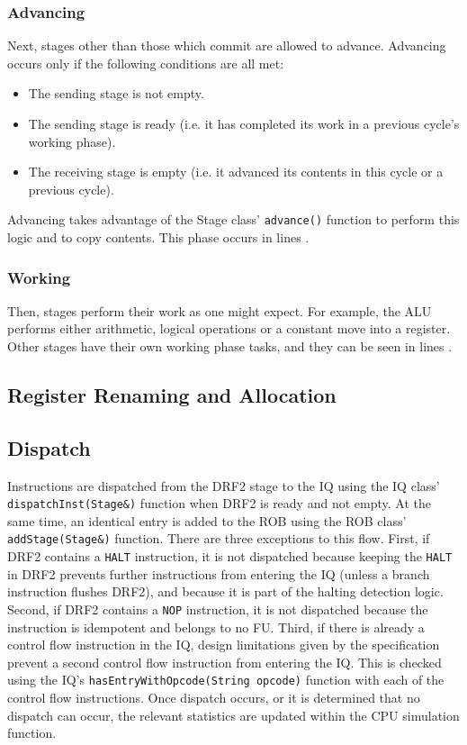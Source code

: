 \documentclass[12pt]{article}
\begin{document}
\subsubsection{Advancing}
Next, stages other than those which commit are allowed to advance.
Advancing occurs only if the following conditions are all met:
\begin{itemize}
  \item The sending stage is not empty.
  \item The sending stage is ready (i.e. it has completed its work in a previous cycle's working phase).
  \item The receiving stage is empty (i.e. it advanced its contents in this cycle or a previous cycle).
\end{itemize}
Advancing takes advantage of the Stage class' \texttt{advance()} function to perform this logic and to copy contents.
This phase occurs in lines .

\subsubsection{Working}
Then, stages perform their work as one might expect. 
For example, the ALU performs either arithmetic, logical operations or a constant move into a register.
Other stages have their own working phase tasks, and they can be seen in lines .


\subsection{Register Renaming and Allocation}
\label{sec:renamealloc}

\subsection{Dispatch}
Instructions are dispatched from the DRF2 stage to the IQ using the IQ class' \texttt{dispatchInst(Stage\&)} function when DRF2 is ready and not empty. 
At the same time, an identical entry is added to the ROB using the ROB class' \texttt{addStage(Stage\&)} function. 
There are three exceptions to this flow.
First, if DRF2 contains a \texttt{HALT} instruction, it is not dispatched because keeping the \texttt{HALT} in DRF2 prevents further instructions from entering the IQ (unless a branch instruction flushes DRF2), and because it is part of the halting detection logic.
Second, if DRF2 contains a \texttt{NOP} instruction, it is not dispatched because the instruction is idempotent and belongs to no FU.
Third, if there is already a control flow instruction in the IQ, design limitations given by the specification prevent a second control flow instruction from entering the IQ.
This is checked using the IQ's \texttt{hasEntryWithOpcode(String opcode)} function with each of the control flow instructions. 
Once dispatch occurs, or it is determined that no dispatch can occur, the relevant statistics are updated within the CPU simulation function.
\end{document}
